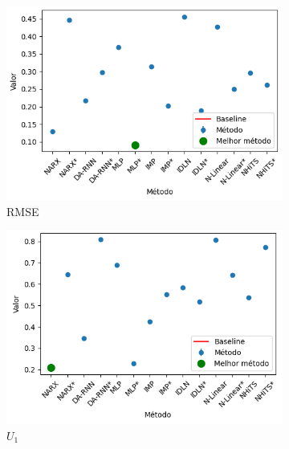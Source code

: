 \begin{figure}[htbp]
	\begin{subfigure}[b]{0.3\textwidth}
		\centering
		\includegraphics[width=\textwidth]{figuras/rmse_brasil_oil_results_test.png}
		\caption{\ac{RMSE}}
		\label{fig:rmse_brasil_oil_results_test}
	\end{subfigure}
	\hfill
	\begin{subfigure}[b]{0.3\textwidth}
		\centering
		\includegraphics[width=\textwidth]{figuras/u1_brasil_oil_results_test.png}
		\caption{\(U_1\)}
		\label{fig:u1_brasil_oil_results_test}
	\end{subfigure}
	\hfill
	\begin{subfigure}[b]{0.3\textwidth}
		\centering

\end{subfigure}
\end{figure}
